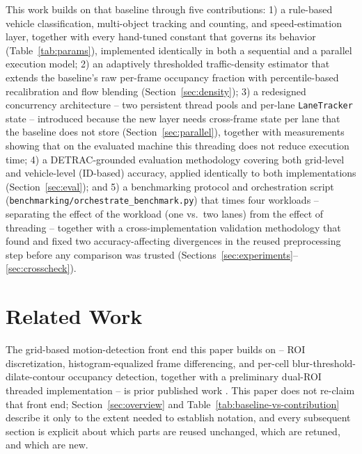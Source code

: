 \documentclass[conference]{IEEEtran}
\newcommand{\code}[1]{\texttt{#1}}
\begin{document}
This work builds on that baseline through five contributions:
1) a rule-based vehicle classification, multi-object tracking and
counting, and speed-estimation layer, together with every hand-tuned
constant that governs its behavior (Table~\ref{tab:params}),
implemented identically in both a sequential and a parallel execution
model; 2) an adaptively thresholded traffic-density estimator that
extends the baseline's raw per-frame occupancy fraction with
percentile-based recalibration and flow blending
(Section~\ref{sec:density}); 3) a redesigned concurrency architecture --
two persistent thread pools and per-lane \code{LaneTracker} state --
introduced because the new layer needs cross-frame state per lane that
the baseline does not store (Section~\ref{sec:parallel}), together with
measurements showing that on the evaluated machine this threading does
not reduce execution time; 4) a DETRAC-grounded evaluation methodology
covering both grid-level and vehicle-level (ID-based) accuracy, applied
identically to both implementations (Section~\ref{sec:eval}); and 5) a
benchmarking protocol and orchestration script
(\code{benchmarking/orchestrate\_benchmark.py}) that times four
workloads -- separating the effect of the workload (one vs.\ two lanes)
from the effect of threading -- together with a cross-implementation
validation methodology that found and fixed two accuracy-affecting
divergences in the reused preprocessing step before any comparison was
trusted (Sections~\ref{sec:experiments}--\ref{sec:crosscheck}).

\section{Related Work}
\label{sec:related}

The grid-based motion-detection front end this paper builds on --
ROI discretization, histogram-equalized frame differencing, and
per-cell blur-threshold-dilate-contour occupancy detection, together
with a preliminary dual-ROI threaded implementation -- is prior
published work \cite{baseline}. This paper does not re-claim that
front end; Section~\ref{sec:overview} and Table~\ref{tab:baseline-vs-contribution}
describe it only to the extent needed to establish notation, and every
subsequent section is explicit about which parts are reused unchanged,
which are retuned, and which are new.
\end{document}
